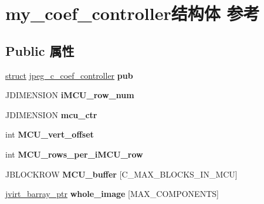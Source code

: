 \hypertarget{structmy__coef__controller}{}\section{my\+\_\+coef\+\_\+controller结构体 参考}
\label{structmy__coef__controller}
\subsection*{Public 属性}
\begin{DoxyCompactItemize}
\item 
\mbox{\label{structmy__coef__controller_a5585d883f38ce6d73d0d2fb31457f4e5}} 
\hyperlink{interfacestruct}{struct} \hyperlink{structjpeg__c__coef__controller}{jpeg\+\_\+c\+\_\+coef\+\_\+controller} {\bfseries pub}
\item 
\mbox{\label{structmy__coef__controller_aebf2f540f71a3af44f75544ef474badb}} 
J\+D\+I\+M\+E\+N\+S\+I\+ON {\bfseries i\+M\+C\+U\+\_\+row\+\_\+num}
\item 
\mbox{\label{structmy__coef__controller_adfe2cbcbfc3c4760874392d8488d88fd}} 
J\+D\+I\+M\+E\+N\+S\+I\+ON {\bfseries mcu\+\_\+ctr}
\item 
\mbox{\label{structmy__coef__controller_a47e8d96f30f813289b02267601c4a7b4}} 
int {\bfseries M\+C\+U\+\_\+vert\+\_\+offset}
\item 
\mbox{\label{structmy__coef__controller_a11bc55a8487bfdd201d2ca756d132023}} 
int {\bfseries M\+C\+U\+\_\+rows\+\_\+per\+\_\+i\+M\+C\+U\+\_\+row}
\item 
\mbox{\label{structmy__coef__controller_a9eac536791caff80d2c99c204237b0ee}} 
J\+B\+L\+O\+C\+K\+R\+OW {\bfseries M\+C\+U\+\_\+buffer} \mbox{[}C\+\_\+\+M\+A\+X\+\_\+\+B\+L\+O\+C\+K\+S\+\_\+\+I\+N\+\_\+\+M\+CU\mbox{]}
\item 
\mbox{\label{structmy__coef__controller_a7860437d85cf3d74579cde629637a476}} 
\hyperlink{structjvirt__barray__control}{jvirt\+\_\+barray\+\_\+ptr} {\bfseries whole\+\_\+image} \mbox{[}M\+A\+X\+\_\+\+C\+O\+M\+P\+O\+N\+E\+N\+TS\mbox{]}

\end{DoxyCompactItemize}
